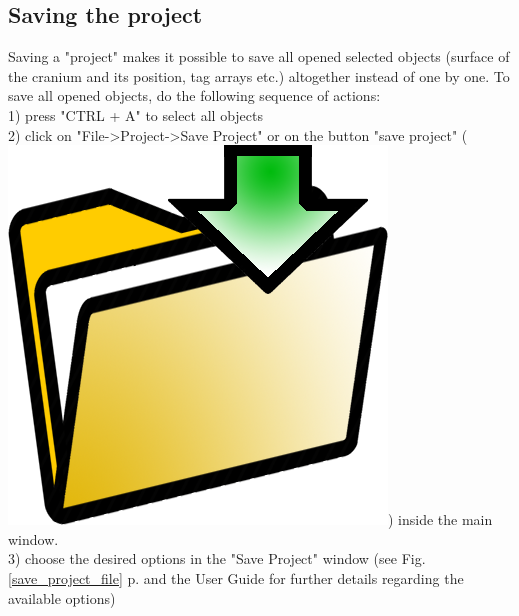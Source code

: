 \documentclass[12pt, a4paper]{book}
\begin{document}
\subsection{Saving the project}
Saving a "project" makes it possible to save all opened selected objects (surface of the cranium and its position, tag arrays etc.) altogether instead of one by one. 
To save all opened objects, do the following sequence of actions:\\
1) press "CTRL + A" to select all objects\\
2) click on "File->Project->Save Project" or on the button "save project" (\includegraphics[scale=0.03]{../images/03/save_data.png})  inside the main window.\\
3) choose the desired options in the "Save Project" window (see Fig. \ref{save_project_file} p.\pageref{save_project_file} and the User Guide for further details regarding the available options)
\end{document}
